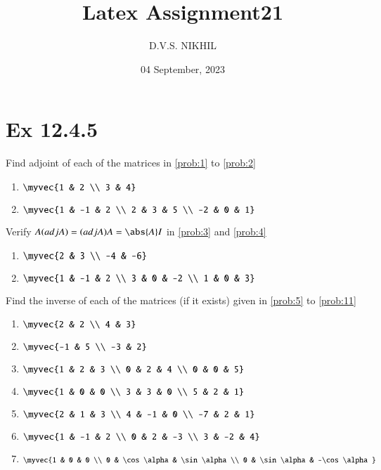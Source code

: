 \documentclass{article}
\theoremstyle{remark}
\begin{document}
\title{Latex Assignment21}
\author{D.V.S. NIKHIL}
\date{04 September, 2023}
\maketitle
\section*{Ex 12.4.5}
Find adjoint of each of the matrices in \ref{prob:1} to \ref{prob:2}
\begin{enumerate}
\item $\myvec
{1 & 2 \\ 3 & 4}$ \label{prob:1}
\item $\myvec
{1 & -1 & 2 \\ 2 & 3 & 5 \\ -2 & 0 & 1}$ \label{prob:2}
\end{enumerate}
Verify $A(adj A)=(adj A)A=\abs{A}I$  in \ref{prob:3} and \ref{prob:4}
\begin{enumerate}[resume]
\item $\myvec
{2 & 3 \\ -4 & -6}$ \label{prob:3}
\item $\myvec
{1 & -1 & 2 \\ 3 & 0 & -2 \\ 1 & 0 & 3}$ \label{prob:4}
\end{enumerate}
Find the inverse of each of the matrices (if it exists) given in \ref{prob:5} to \ref{prob:11}
\begin{enumerate}[resume]
\item $\myvec
{2 & 2 \\ 4 & 3}$ \label{prob:5}
\item $\myvec
{-1 & 5 \\ -3 & 2}$
\item $\myvec
{1 & 2 & 3 \\ 0 & 2 & 4 \\ 0 & 0 & 5}$
\item $\myvec
{1 & 0 & 0 \\ 3 & 3 & 0 \\ 5 & 2 & 1}$
\item $\myvec
{2 & 1 & 3 \\ 4 & -1 & 0 \\ -7 & 2 & 1}$
\item $\myvec
{1 & -1 & 2 \\ 0 & 2 & -3 \\ 3 & -2 & 4}$
\item $\myvec
{1 & 0 & 0 \\ 0 & \cos \alpha & \sin \alpha \\ 0 & \sin \alpha & -\cos \alpha}$ \label{prob:11}
\end{enumerate}
\end{document}

